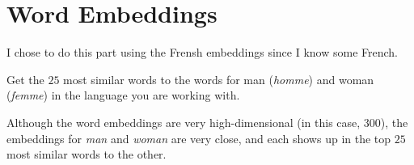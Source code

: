 \section{Word Embeddings}

I chose to do this part using the Frensh embeddings
since I know some French.

\begin{problem}[1]
  Get the $25$ most similar words to the words for man (\emph{homme})
  and woman (\emph{femme}) in the language you are working with.

  \begin{answer}
    Although the word embeddings are very high-dimensional
    (in this case, $300$), the embeddings for \emph{man}
    and \emph{woman} are very close, and each shows up in the
    top $25$ most similar words to the other.
  \end{answer}


\end{problem}
